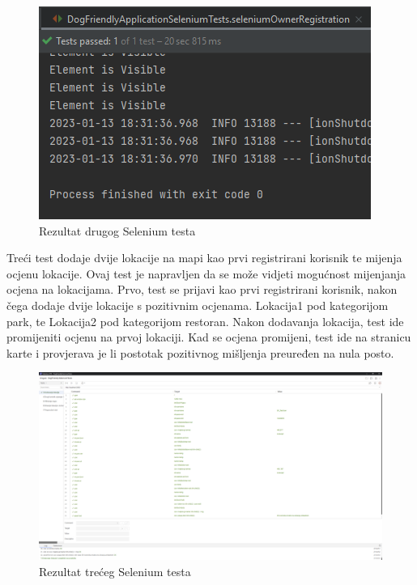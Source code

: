         \begin{figure}[H]
			    \includegraphics[width=\textwidth]{slike/passed-selenium2.png} 
			        \caption{Rezultat drugog Selenium testa}
			    \label{fig:Rezultat drugog Selenium testa}
		\end{figure}

        \textbf{}{Treći test dodaje dvije lokacije na mapi kao prvi registrirani korisnik te mijenja ocjenu lokacije. Ovaj test je napravljen da se može vidjeti mogućnost mijenjanja ocjena na lokacijama. Prvo, test se prijavi kao prvi registrirani korisnik, nakon čega dodaje dvije lokacije s pozitivnim ocjenama. Lokacija1 pod kategorijom park, te Lokacija2 pod kategorijom restoran. Nakon dodavanja lokacija, test ide promijeniti ocjenu na prvoj lokaciji. Kad se ocjena promijeni, test ide na stranicu karte i provjerava je li postotak pozitivnog mišljenja preuređen na nula posto.}

        \begin{figure}[H]
			    \includegraphics[width=\textwidth]{slike/passed-selenium3.png} 
			        \caption{Rezultat trećeg Selenium testa}
			    \label{fig:Rezultat trećeg Selenium testa}
		\end{figure}


